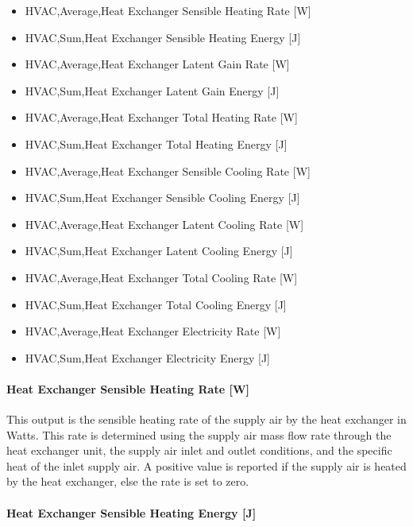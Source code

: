 \begin{itemize}
\item
  HVAC,Average,Heat Exchanger Sensible Heating Rate {[}W{]}
\item
  HVAC,Sum,Heat Exchanger Sensible Heating Energy {[}J{]}
\item
  HVAC,Average,Heat Exchanger Latent Gain Rate {[}W{]}
\item
  HVAC,Sum,Heat Exchanger Latent Gain Energy {[}J{]}
\item
  HVAC,Average,Heat Exchanger Total Heating Rate {[}W{]}
\item
  HVAC,Sum,Heat Exchanger Total Heating Energy {[}J{]}
\item
  HVAC,Average,Heat Exchanger Sensible Cooling Rate {[}W{]}
\item
  HVAC,Sum,Heat Exchanger Sensible Cooling Energy {[}J{]}
\item
  HVAC,Average,Heat Exchanger Latent Cooling Rate {[}W{]}
\item
  HVAC,Sum,Heat Exchanger Latent Cooling Energy {[}J{]}
\item
  HVAC,Average,Heat Exchanger Total Cooling Rate {[}W{]}
\item
  HVAC,Sum,Heat Exchanger Total Cooling Energy {[}J{]}
\item
  HVAC,Average,Heat Exchanger Electricity Rate {[}W{]}
\item
  HVAC,Sum,Heat Exchanger Electricity Energy {[}J{]}
\end{itemize}

\paragraph{Heat Exchanger Sensible Heating Rate {[}W{]}}\label{heat-exchanger-sensible-heating-rate-w}

This output is the sensible heating rate of the supply air by the heat exchanger in Watts. This rate is determined using the supply air mass flow rate through the heat exchanger unit, the supply air inlet and outlet conditions, and the specific heat of the inlet supply air. A positive value is reported if the supply air is heated by the heat exchanger, else the rate is set to zero.

\paragraph{Heat Exchanger Sensible Heating Energy {[}J{]}}\label{heat-exchanger-sensible-heating-energy-j}

